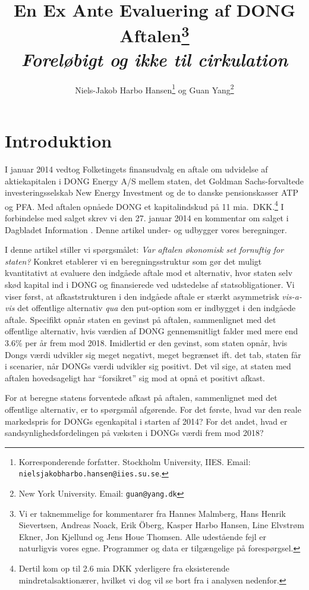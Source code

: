 \documentclass{article}
\title{En Ex Ante Evaluering af DONG Aftalen\thanks{Vi er taknemmelige for kommentarer fra Hannes Malmberg, Hans Henrik Sievertsen, Andreas Noack, Erik {\"O}berg, Kasper Harbo Hansen, Line Elvstrøm Ekner, Jon Kjellund og Jens Houe Thomsen. Alle udestående fejl er naturligvis vores egne.  Programmer og data er tilgængelige på forespørgsel.} \\ \emph{Foreløbigt og ikke til cirkulation}}
\author{Niels-Jakob Harbo Hansen\thanks{Korresponderende forfatter. Stockholm University, IIES.  Email: \texttt{nielsjakobharbo.hansen@iies.su.se}. } \hspace{0.1 mm} og Guan Yang\thanks{New York University.  Email: \texttt{guan@yang.dk}}}
\begin{document}
\maketitle

\newpage

\section{Introduktion}


I januar 2014 vedtog Folketingets finansudvalg en aftale om udvidelse af aktiekapitalen i DONG Energy A/S mellem staten, det Goldman Sachs-forvaltede investeringsselskab New Energy Investment og de to danske pensionskasser ATP og PFA\@. Med aftalen opnåede DONG et kapitalindskud på 11 mia.\ DKK.\footnote{Dertil kom op til 2.6 mia DKK yderligere fra eksisterende mindretalsaktionærer, hvilket vi dog vil se bort fra i analysen nedenfor.} I forbindelse med salget skrev vi den 27. januar 2014 en kommentar om salget i Dagbladet Information \citep{Hansen2014}. Denne artikel under- og udbygger vores beregninger.

I denne artikel stiller vi spørgsmålet: \emph{Var aftalen økonomisk set fornuftig for staten?} Konkret etablerer vi en beregningsstruktur som gør det muligt kvantitativt at evaluere den indgåede aftale mod et alternativ, hvor staten selv skød kapital ind i DONG og finansierede ved udstedelse af statsobligationer. Vi viser først, at afkaststrukturen i den indgåede aftale er stærkt asymmetrisk \emph{vis-a-vis} det offentlige alternativ \emph{qua} den put-option som er indbygget i den indgåede aftale. Specifikt opnår staten en gevinst på aftalen, sammenlignet med det offentlige alternativ, hvis værdien af DONG gennemsnitligt falder med mere end 3.6\% per år frem mod 2018. Imidlertid er den gevinst, som staten opnår, hvis Dongs værdi udvikler sig meget negativt, meget begrænset ift. det tab, staten får i scenarier, når DONGs værdi udvikler sig positivt. Det vil sige, at staten med aftalen hovedsageligt har \enquote{forsikret} sig mod at opnå et positivt afkast. 

For at beregne statens forventede afkast på aftalen, sammenlignet med det offentlige alternativ, er to spørgsmål afgørende. For det første, hvad var den reale markedspris for DONGs egenkapital i starten af 2014? For det andet, hvad er sandsynlighedsfordelingen på væksten i DONGs værdi frem mod 2018? 
\end{document}
